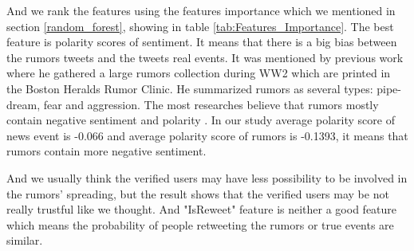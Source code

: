  And we rank the features using the features importance which we mentioned in section \ref{random_forest}, showing in table \ref{tab:Features_Importance}. The best feature is polarity scores of sentiment. It means that there is a big bias between the rumors tweets and the tweets real events. It was mentioned by previous work \cite{allport1947psychology} where he gathered a large rumors collection during WW2 which are printed in the Boston Heralds Rumor Clinic. He summarized rumors as several types:  pipe-dream, fear and aggression. The most researches believe that rumors mostly contain negative sentiment and polarity \cite{sunstein2014rumors}\cite{kwon2013aspects}. In our study average polarity score of news event is -0.066 and average polarity score of rumors is -0.1393, it means that rumors contain more negative sentiment. 
 
 And we usually think the verified users may have less possibility to be involved in the rumors' spreading, but the result shows that the verified users may be not really trustful like we thought. And "IsReweet" feature is neither a good feature which means the probability of people retweeting the rumors or true events are similar.
 
  
 

